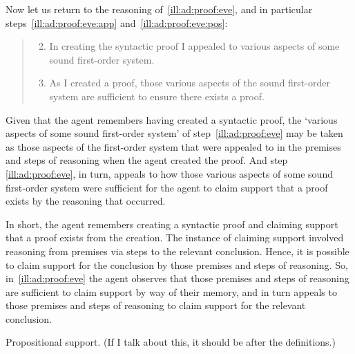 \begin{note}
  Now let us return to the reasoning of~\autoref{ill:ad:proof:eve}, and in particular steps~\ref{ill:ad:proof:eve:app} and~\ref{ill:ad:proof:eve:pos}:
  \begin{quote}
    \begin{enumerate}
      \setcounter{enumi}{1}
    \item In creating the syntactic proof I appealed to various aspects of some sound first-order system.
    \item As I created a proof, those various aspects of the sound first-order system are sufficient to ensure there exists a proof.
    \end{enumerate}
  \end{quote}
  Given that the agent remembers having created a syntactic proof, the `various aspects of some sound first-order system' of step~\ref{ill:ad:proof:eve} may be taken as those aspects of the first-order system that were appealed to in the premises and steps of reasoning when the agent created the proof.
  And step \ref{ill:ad:proof:eve}, in turn, appeals to how those various aspects of some sound first-order system were sufficient for the agent to claim support that a proof exists by the reasoning that occurred.

  In short, the agent remembers creating a syntactic proof and claiming support that a proof exists from the creation.
  The instance of claiming support involved reasoning from premises via steps to the relevant conclusion.
  Hence, it is possible to claim support for the conclusion by those premises and steps of reasoning.
  So, in~\ref{ill:ad:proof:eve} the agent observes that those premises and steps of reasoning are sufficient to claim support by way of their memory, and in turn appeals to those premises and steps of reasoning to claim support for the relevant conclusion.
\end{note}

\begin{note}
  {
    \color{red}
    Propositional support.
    (If I talk about this, it should be after the definitions.)
  }
\end{note}

